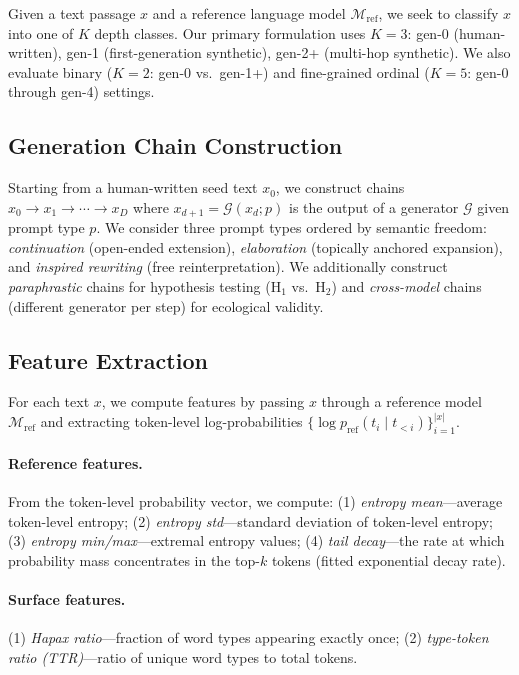 \documentclass[letterpaper,11pt]{article}
\begin{document}
Given a text passage $x$ and a reference language model $\mathcal{M}_\text{ref}$, we seek to classify $x$ into one of $K$ depth classes. Our primary formulation uses $K = 3$: gen-0 (human-written), gen-1 (first-generation synthetic), gen-2+ (multi-hop synthetic). We also evaluate binary ($K = 2$: gen-0 vs.\ gen-1+) and fine-grained ordinal ($K = 5$: gen-0 through gen-4) settings.

\subsection{Generation Chain Construction}

Starting from a human-written seed text $x_0$, we construct chains $x_0 \to x_1 \to \cdots \to x_D$ where $x_{d+1} = \mathcal{G}(x_d; p)$ is the output of a generator $\mathcal{G}$ given prompt type $p$. We consider three prompt types ordered by semantic freedom: \emph{continuation} (open-ended extension), \emph{elaboration} (topically anchored expansion), and \emph{inspired rewriting} (free reinterpretation). We additionally construct \emph{paraphrastic} chains for hypothesis testing (H$_1$ vs.\ H$_2$) and \emph{cross-model} chains (different generator per step) for ecological validity.

\subsection{Feature Extraction}

For each text $x$, we compute features by passing $x$ through a reference model $\mathcal{M}_\text{ref}$ and extracting token-level log-probabilities $\{\log p_\text{ref}(t_i \mid t_{<i})\}_{i=1}^{|x|}$.

\paragraph{Reference features.} From the token-level probability vector, we compute: (1) \textit{entropy mean}---average token-level entropy; (2) \textit{entropy std}---standard deviation of token-level entropy; (3) \textit{entropy min/max}---extremal entropy values; (4) \textit{tail decay}---the rate at which probability mass concentrates in the top-$k$ tokens (fitted exponential decay rate).

\paragraph{Surface features.} (1) \textit{Hapax ratio}---fraction of word types appearing exactly once; (2) \textit{type-token ratio (TTR)}---ratio of unique word types to total tokens.
\end{document}
